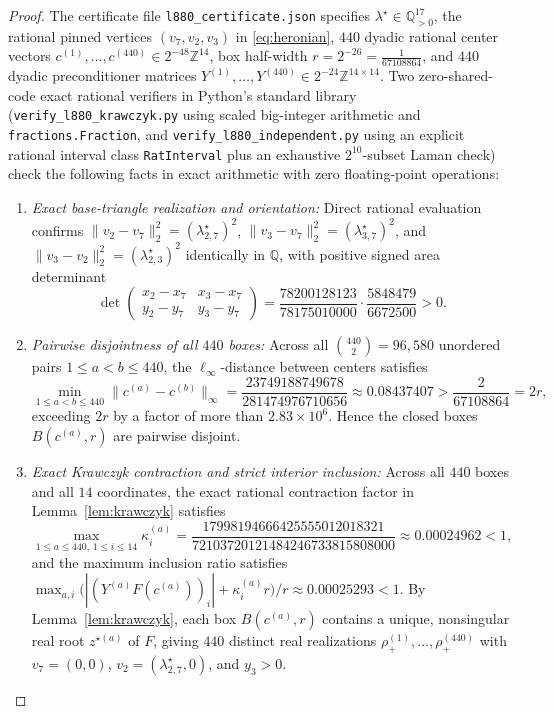 \documentclass[11pt,a4paper]{article}
\theoremstyle{definition}
\theoremstyle{remark}
\begin{document}
\begin{proof}
The certificate file \texttt{l880\_certificate.json} specifies $\lambda^\star \in \mathbb{Q}_{>0}^{17}$, the rational pinned vertices $(v_7, v_2, v_3)$ in \eqref{eq:heronian}, $440$ dyadic rational center vectors $c^{(1)}, \dots, c^{(440)} \in 2^{-48}\mathbb{Z}^{14}$, box half-width $r = 2^{-26} = \frac{1}{67108864}$, and $440$ dyadic preconditioner matrices $Y^{(1)}, \dots, Y^{(440)} \in 2^{-24}\mathbb{Z}^{14 \times 14}$. Two zero-shared-code exact rational verifiers in Python's standard library (\texttt{verify\_l880\_krawczyk.py} using scaled big-integer arithmetic and \texttt{fractions.Fraction}, and \texttt{verify\_l880\_independent.py} using an explicit rational interval class \texttt{RatInterval} plus an exhaustive $2^{10}$-subset Laman check) check the following facts in exact arithmetic with zero floating-point operations:
\begin{enumerate}
\setlength{\itemsep}{2pt}
\item \emph{Exact base-triangle realization and orientation:} Direct rational evaluation confirms $\|v_2 - v_7\|_2^2 = (\lambda_{2,7}^\star)^2$, $\|v_3 - v_7\|_2^2 = (\lambda_{3,7}^\star)^2$, and $\|v_3 - v_2\|_2^2 = (\lambda_{2,3}^\star)^2$ identically in $\mathbb{Q}$, with positive signed area determinant
\[
\det\begin{pmatrix} x_2 - x_7 & x_3 - x_7 \\ y_2 - y_7 & y_3 - y_7 \end{pmatrix}
= \frac{78200128123}{78175010000} \cdot \frac{5848479}{6672500} > 0.
\]
\item \emph{Pairwise disjointness of all $440$ boxes:} Across all $\binom{440}{2} = 96{,}580$ unordered pairs $1 \le a < b \le 440$, the $\ell_\infty$-distance between centers satisfies
\[
\min_{1 \le a < b \le 440} \|c^{(a)} - c^{(b)}\|_\infty = \frac{23749188749678}{281474976710656} \approx 0.08437407 > \frac{2}{67108864} = 2r,
\]
exceeding $2r$ by a factor of more than $2.83 \times 10^6$. Hence the closed boxes $B(c^{(a)}, r)$ are pairwise disjoint.
\item \emph{Exact Krawczyk contraction and strict interior inclusion:} Across all $440$ boxes and all $14$ coordinates, the exact rational contraction factor in Lemma~\ref{lem:krawczyk} satisfies
\[
\max_{1 \le a \le 440,\, 1 \le i \le 14} \kappa_i^{(a)}
= \frac{17998194666425555012018321}{72103720121484246733815808000} \approx 0.00024962 < 1,
\]
and the maximum inclusion ratio satisfies $\max_{a,i} \bigl(|(Y^{(a)} F(c^{(a)}))_i| + \kappa_i^{(a)} r\bigr)/r \approx 0.00025293 < 1$. By Lemma~\ref{lem:krawczyk}, each box $B(c^{(a)}, r)$ contains a unique, nonsingular real root $z^{\star(a)}$ of $F$, giving $440$ distinct real realizations $\rho_+^{(1)}, \dots, \rho_+^{(440)}$ with $v_7 = (0,0)$, $v_2 = (\lambda_{2,7}^\star, 0)$, and $y_3 > 0$.

\end{enumerate}
\end{proof}
\end{document}
